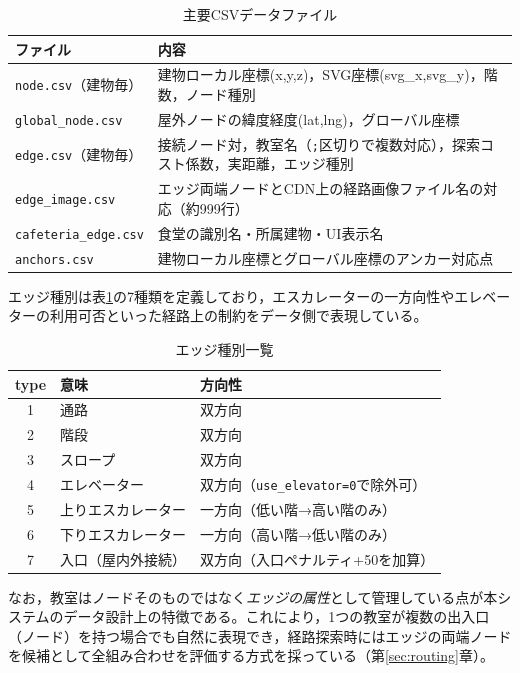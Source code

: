 \documentclass[a4paper,10.5pt]{ltjsarticle}
\begin{document}
\begin{table}[h]
\centering
\small
\caption{主要CSVデータファイル}
\begin{tabular}{lp{9.5cm}}
\toprule
ファイル & 内容 \\
\midrule
\texttt{node.csv}（建物毎） & 建物ローカル座標(x,y,z)，SVG座標(svg\_x,svg\_y)，階数，ノード種別 \\
\texttt{global\_node.csv} & 屋外ノードの緯度経度(lat,lng)，グローバル座標 \\
\texttt{edge.csv}（建物毎） & 接続ノード対，教室名（\texttt{;}区切りで複数対応），探索コスト係数，実距離，エッジ種別 \\
\texttt{edge\_image.csv} & エッジ両端ノードとCDN上の経路画像ファイル名の対応（約999行） \\
\texttt{cafeteria\_edge.csv} & 食堂の識別名・所属建物・UI表示名 \\
\texttt{anchors.csv} & 建物ローカル座標とグローバル座標のアンカー対応点 \\
\bottomrule
\end{tabular}
\end{table}

エッジ種別は表\ref{tab:edgetype}の7種類を定義しており，エスカレーターの一方向性やエレベーターの利用可否といった経路上の制約をデータ側で表現している。

\begin{table}[h]
\centering
\caption{エッジ種別一覧}
\label{tab:edgetype}
\begin{tabular}{cll}
\toprule
type & 意味 & 方向性 \\
\midrule
1 & 通路 & 双方向 \\
2 & 階段 & 双方向 \\
3 & スロープ & 双方向 \\
4 & エレベーター & 双方向（\texttt{use\_elevator=0}で除外可） \\
5 & 上りエスカレーター & 一方向（低い階→高い階のみ） \\
6 & 下りエスカレーター & 一方向（高い階→低い階のみ） \\
7 & 入口（屋内外接続） & 双方向（入口ペナルティ+50を加算） \\
\bottomrule
\end{tabular}
\end{table}

なお，教室はノードそのものではなく\emph{エッジの属性}として管理している点が本システムのデータ設計上の特徴である。これにより，1つの教室が複数の出入口（ノード）を持つ場合でも自然に表現でき，経路探索時にはエッジの両端ノードを候補として全組み合わせを評価する方式を採っている（第\ref{sec:routing}章）。
\end{document}
